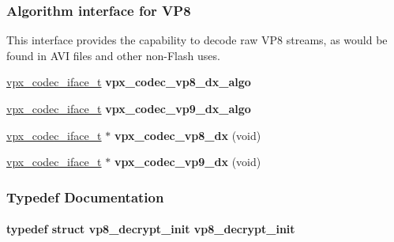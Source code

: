 \subsubsection*{\-Algorithm interface for \-V\-P8}
\label{_amgrp0b829b38ff2e659173b35cd78e0735bd}%
 \-This interface provides the capability to decode raw \-V\-P8 streams, as would be found in \-A\-V\-I files and other non-\/\-Flash uses. \begin{DoxyCompactItemize}
\item 
\hypertarget{group__vp8__decoder_ga1e151f9094620511e7aa49c04bf8b79e}{\hyperlink{group__codec_gad654f3da60151f5dfef70aca00ef1e9e}{vpx\-\_\-codec\-\_\-iface\-\_\-t} {\bfseries vpx\-\_\-codec\-\_\-vp8\-\_\-dx\-\_\-algo}}\label{group__vp8__decoder_ga1e151f9094620511e7aa49c04bf8b79e}

\item 
\hypertarget{group__vp8__decoder_gabb581a7e48d55dbda975c8bfbc2d615c}{\hyperlink{group__codec_gad654f3da60151f5dfef70aca00ef1e9e}{vpx\-\_\-codec\-\_\-iface\-\_\-t} {\bfseries vpx\-\_\-codec\-\_\-vp9\-\_\-dx\-\_\-algo}}\label{group__vp8__decoder_gabb581a7e48d55dbda975c8bfbc2d615c}

\item 
\hypertarget{group__vp8__decoder_ga105d15fdb6baef8a2f02d6d5283847fb}{\hyperlink{group__codec_gad654f3da60151f5dfef70aca00ef1e9e}{vpx\-\_\-codec\-\_\-iface\-\_\-t} $\ast$ {\bfseries vpx\-\_\-codec\-\_\-vp8\-\_\-dx} (void)}\label{group__vp8__decoder_ga105d15fdb6baef8a2f02d6d5283847fb}

\item 
\hypertarget{group__vp8__decoder_ga62b70b5b21a01ab2d57adb9f67f25d60}{\hyperlink{group__codec_gad654f3da60151f5dfef70aca00ef1e9e}{vpx\-\_\-codec\-\_\-iface\-\_\-t} $\ast$ {\bfseries vpx\-\_\-codec\-\_\-vp9\-\_\-dx} (void)}\label{group__vp8__decoder_ga62b70b5b21a01ab2d57adb9f67f25d60}

\end{DoxyCompactItemize}


\subsubsection{\-Typedef \-Documentation}
\hypertarget{group__vp8__decoder_ga718de6c94c9561b35aa7497f1182758b}{
\paragraph[{vp8\-\_\-decrypt\-\_\-init}]{\setlength{\rightskip}{0pt plus 5cm}typedef struct {\bf vp8\-\_\-decrypt\-\_\-init}  {\bf vp8\-\_\-decrypt\-\_\-init}}}\label{group__vp8__decoder_ga718de6c94c9561b35aa7497f1182758b}


